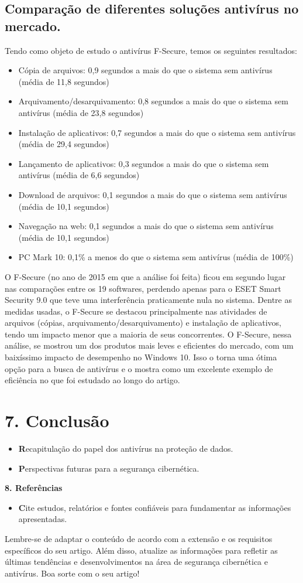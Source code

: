 \documentclass[10pt,conference,twocolumn]{article}
\begin{document}
\subsection* {Comparação de diferentes soluções antivírus no mercado.}
Tendo como objeto de estudo o antivírus F-Secure, temos os seguintes resultados:
\begin{itemize}
\item
Cópia de arquivos: 0,9 segundos a mais do que o sistema sem antivírus (média de 11,8 segundos)
\item
Arquivamento/desarquivamento: 0,8 segundos a mais do que o sistema sem antivírus (média de 23,8 segundos)
\item
Instalação de aplicativos: 0,7 segundos a mais do que o sistema sem antivírus (média de 29,4 segundos)
\item
Lançamento de aplicativos: 0,3 segundos a mais do que o sistema sem antivírus (média de 6,6 segundos)
\item
Download de arquivos: 0,1 segundos a mais do que o sistema sem antivírus (média de 10,1 segundos)
\item
Navegação na web: 0,1 segundos a mais do que o sistema sem antivírus (média de 10,1 segundos)
\item
PC Mark 10: 0,1\% a menos do que o sistema sem antivírus (média de 100\%)
\end{itemize}
O F-Secure (no ano de 2015 em que a análise foi feita) ficou em segundo lugar nas comparações entre os 19 softwares, perdendo apenas para o ESET Smart Security 9.0 que teve uma interferência praticamente nula no sistema.
Dentre as medidas usadas, o F-Secure se destacou principalmente nas atividades de arquivos (cópias, arquivamento/desarquivamento) e instalação de aplicativos, tendo um impacto menor que a maioria de seus concorrentes.
O F-Secure, nessa análise, se mostrou um dos produtos mais leves e eficientes do mercado, com um baixíssimo impacto de desempenho no Windows 10. Isso o torna uma ótima opção para a busca de antivírus e o mostra como um excelente exemplo de eficiência no que foi estudado ao longo do artigo.

\section* {7. Conclusão}
 \begin{itemize}
\item \textbf Recapitulação do papel dos antivírus na proteção de dados.
\item \textbf Perspectivas futuras para a segurança cibernética.
\end{itemize}

\textbf {8. Referências}
 \begin{itemize}
\item \textbf Cite estudos, relatórios e fontes confiáveis para fundamentar as informações apresentadas.
\end{itemize}

Lembre-se de adaptar o conteúdo de acordo com a extensão e os requisitos específicos do seu artigo. Além disso, atualize as informações para refletir as últimas tendências e desenvolvimentos na área de segurança cibernética e antivírus. Boa sorte com o seu artigo!
\end{document}

